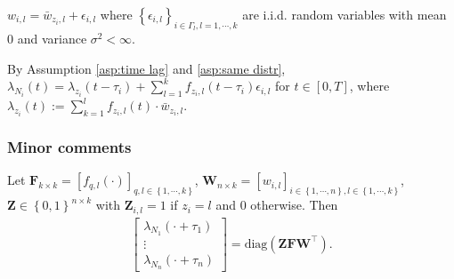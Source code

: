 \begin{assumption}\label{asp:same distr}
$w_{i,l}=\bar w_{z_i,l}+\epsilon_{i,l}$ where $\left\{ \epsilon_{i,l} \right\}_{i\in\Gamma_l,l=1,\cdots,k}$ are i.i.d. random variables with mean $0$ and variance $\sigma^2<\infty$.
\end{assumption}
\noindent
By Assumption \ref{asp:time lag} and \ref{asp:same distr}, $\lambda_{N_i}(t)=\lambda_{z_i}(t-\tau_i)+\sum_{l=1}^kf_{z_i,l}(t-\tau_i)\epsilon_{i,l}$ for $t\in[0,T]$, where $\lambda_{z_i}(t):=\sum_{k=1}^lf_{z_i,l}(t)\cdot\bar w_{z_i,l}$.

\subsubsection*{Minor comments}

Let $\mathbf{F}_{k\times k} = [f_{q,l}(\cdot)]_{q,l\in \left\{ 1,\cdots,k \right\}}$, $\mathbf W_{n\times k} = [w_{i,l}]_{i\in \left\{ 1,\cdots,n \right\}, l\in \left\{ 1,\cdots,k \right\}}$, $\mathbf{Z}\in \left\{ 0,1 \right\}^{n\times k}$ with $\mathbf Z_{i,l}=1$ if $z_i=l$ and $0$ otherwise. Then
\begin{align*}
\begin{bmatrix}
\lambda_{N_1}(\cdot+\tau_1)\\
\vdots\\
\lambda_{N_n}(\cdot+\tau_n)
\end{bmatrix}=\text{diag}\left( \mathbf{ZFW}^\top \right) .
\end{align*}

